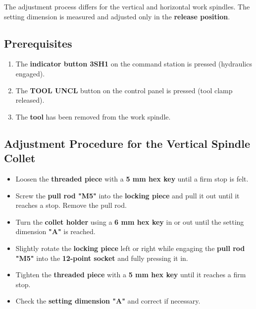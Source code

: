 
The adjustment process differs for the vertical and horizontal work spindles.  
The setting dimension is measured and adjusted only in the \textbf{release position}.

\subsection*{Prerequisites}

\begin{enumerate}
    \item The \textbf{indicator button {3SH1}} on the command station is pressed (hydraulics engaged).\footnotemark[1]
    \item The \textbf{TOOL UNCL} button on the control panel is pressed (tool clamp released).\footnotemark[1]
    \item The \textbf{tool} has been removed from the work spindle.
\end{enumerate}

\subsection*{Adjustment Procedure for the Vertical Spindle Collet}

\begin{itemize}
    \item Loosen the \textbf{threaded piece } with a \textbf{5 mm hex key} until a firm stop is felt.
    \item Screw the \textbf{pull rod "M5"} into the \textbf{locking piece } and pull it out until it reaches a stop. Remove the pull rod.
    \item Turn the \textbf{collet holder } using a \textbf{6 mm hex key} in or out until the setting dimension \textbf{"A"} is reached.
    \item Slightly rotate the \textbf{locking piece } left or right while engaging the \textbf{pull rod "M5"} into the \textbf{12-point socket } and fully pressing it in.
    \item Tighten the \textbf{threaded piece } with a \textbf{5 mm hex key} until it reaches a firm stop.
    \item Check the \textbf{setting dimension "A"} and correct if necessary.
\end{itemize}

